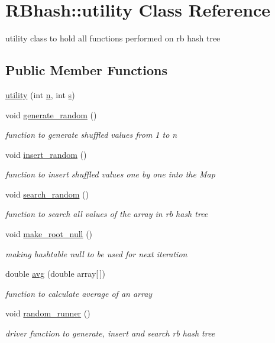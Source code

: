 \hypertarget{class_r_bhash_1_1utility}{\section{R\-Bhash\-:\-:utility Class Reference}
\label{class_r_bhash_1_1utility}
}


utility class to hold all functions performed on rb hash tree  


\subsection*{Public Member Functions}
\begin{DoxyCompactItemize}
\item 
\hyperlink{class_r_bhash_1_1utility_ae76de95e6fb70f51fa627fb236fadd51}{utility} (int \hyperlink{class_r_bhash_1_1utility_aa3e63fea701cf99046aeab691ba4da41}{n}, int \hyperlink{class_r_bhash_1_1utility_a5674754a0754872a1c2a2931f5495a21}{s})
\item 
void \hyperlink{class_r_bhash_1_1utility_a8b7ff7afd8c99718648a9650b098f26a}{generate\-\_\-random} ()
\begin{DoxyCompactList}\small\item\em function to generate shuffled values from 1 to n \end{DoxyCompactList}\item 
void \hyperlink{class_r_bhash_1_1utility_aef5b38b496a85789fe78f40e3c0d3d3f}{insert\-\_\-random} ()
\begin{DoxyCompactList}\small\item\em function to insert shuffled values one by one into the Map \end{DoxyCompactList}\item 
void \hyperlink{class_r_bhash_1_1utility_aa1f8ffc0fdb60237c60c9d7bb8fb2922}{search\-\_\-random} ()
\begin{DoxyCompactList}\small\item\em function to search all values of the array in rb hash tree \end{DoxyCompactList}\item 
void \hyperlink{class_r_bhash_1_1utility_ade83d8589891e215e53676e746f87020}{make\-\_\-root\-\_\-null} ()
\begin{DoxyCompactList}\small\item\em making hashtable null to be used for next iteration \end{DoxyCompactList}\item 
double \hyperlink{class_r_bhash_1_1utility_ae0fdd73d6d66800efd9fe2f812ee633b}{avg} (double array\mbox{[}$\,$\mbox{]})
\begin{DoxyCompactList}\small\item\em function to calculate average of an array \end{DoxyCompactList}\item 
void \hyperlink{class_r_bhash_1_1utility_aa978a65e2cce337f10ef6ecdb7a08ad9}{random\-\_\-runner} ()
\begin{DoxyCompactList}\small\item\em driver function to generate, insert and search rb hash tree \end{DoxyCompactList}\end{DoxyCompactItemize}
